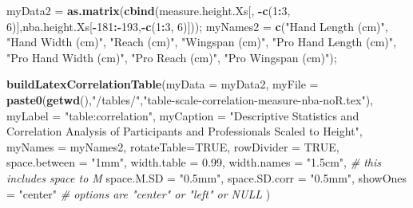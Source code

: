\documentclass[]{article}
\newenvironment{Shaded}{\begin{snugshade}}{\end{snugshade}}
\newcommand{\CommentTok}[1]{\textcolor[rgb]{0.56,0.35,0.01}{\textit{#1}}}
\newcommand{\DataTypeTok}[1]{\textcolor[rgb]{0.13,0.29,0.53}{#1}}
\newcommand{\DecValTok}[1]{\textcolor[rgb]{0.00,0.00,0.81}{#1}}
\newcommand{\FloatTok}[1]{\textcolor[rgb]{0.00,0.00,0.81}{#1}}
\newcommand{\KeywordTok}[1]{\textcolor[rgb]{0.13,0.29,0.53}{\textbf{#1}}}
\newcommand{\NormalTok}[1]{#1}
\newcommand{\OperatorTok}[1]{\textcolor[rgb]{0.81,0.36,0.00}{\textbf{#1}}}
\newcommand{\OtherTok}[1]{\textcolor[rgb]{0.56,0.35,0.01}{#1}}
\newcommand{\StringTok}[1]{\textcolor[rgb]{0.31,0.60,0.02}{#1}}
\begin{document}
\begin{Shaded}
\begin{Highlighting}[]
\NormalTok{myData2 =}\StringTok{ }\KeywordTok{as.matrix}\NormalTok{(}\KeywordTok{cbind}\NormalTok{(measure.height.Xs[, }\OperatorTok{-}\KeywordTok{c}\NormalTok{(}\DecValTok{1}\OperatorTok{:}\DecValTok{3}\NormalTok{, }\DecValTok{6}\NormalTok{)],nba.height.Xs[}\OperatorTok{-}\DecValTok{181}\OperatorTok{:-}\DecValTok{193}\NormalTok{,}\OperatorTok{-}\KeywordTok{c}\NormalTok{(}\DecValTok{1}\OperatorTok{:}\DecValTok{3}\NormalTok{, }\DecValTok{6}\NormalTok{)]));}
\NormalTok{myNames2 =}\StringTok{ }\KeywordTok{c}\NormalTok{(}\StringTok{"Hand Length (cm)"}\NormalTok{, }\StringTok{"Hand Width (cm)"}\NormalTok{,  }\StringTok{"Reach (cm)"}\NormalTok{, }\StringTok{"Wingspan (cm)"}\NormalTok{,}
            \StringTok{"Pro Hand Length (cm)"}\NormalTok{, }\StringTok{"Pro Hand Width (cm)"}\NormalTok{, }\StringTok{"Pro Reach (cm)"}\NormalTok{, }\StringTok{"Pro Wingspan (cm)"}\NormalTok{);}


\KeywordTok{buildLatexCorrelationTable}\NormalTok{(}\DataTypeTok{myData =}\NormalTok{ myData2, }
                                \DataTypeTok{myFile =} \KeywordTok{paste0}\NormalTok{(}\KeywordTok{getwd}\NormalTok{(),}\StringTok{"/tables/"}\NormalTok{,}\StringTok{"table-scale-correlation-measure-nba-noR.tex"}\NormalTok{),}
                                \DataTypeTok{myLabel =} \StringTok{"table:correlation"}\NormalTok{,}
                                \DataTypeTok{myCaption =} \StringTok{"Descriptive Statistics and Correlation Analysis of Participants and Professionals Scaled to Height"}\NormalTok{,}
                                \DataTypeTok{myNames =}\NormalTok{ myNames2,}
                                \DataTypeTok{rotateTable=}\OtherTok{TRUE}\NormalTok{,}
                                \DataTypeTok{rowDivider =} \OtherTok{TRUE}\NormalTok{,}
                                \DataTypeTok{space.between =} \StringTok{"1mm"}\NormalTok{,}
                                \DataTypeTok{width.table =} \FloatTok{0.99}\NormalTok{,}
                                \DataTypeTok{width.names =} \StringTok{"1.5cm"}\NormalTok{, }\CommentTok{# this includes space to M}
                                \DataTypeTok{space.M.SD =} \StringTok{"0.5mm"}\NormalTok{,}
                                \DataTypeTok{space.SD.corr =} \StringTok{"0.5mm"}\NormalTok{,}
                                \DataTypeTok{showOnes =} \StringTok{"center"} \CommentTok{# options are "center" or "left" or NULL}
\NormalTok{                                )}
\end{Highlighting}
\end{Shaded}






\newpage
\theendnotes

\newpage
\begin{auxmulticols}{2}
\singlespacing 


\end{auxmulticols}

\newpage
{
\hypersetup{linkcolor=black}
\setcounter{tocdepth}{3}
\tableofcontents
}
\end{document}
